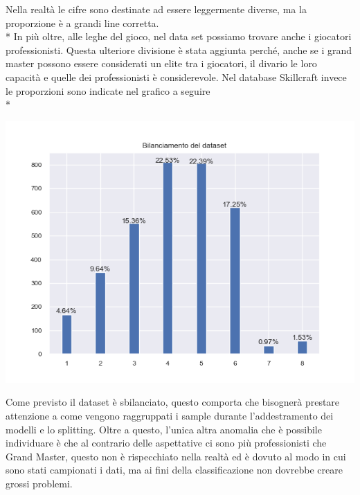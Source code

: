 Nella realtà le cifre sono destinate ad essere leggermente diverse, ma la proporzione è a grandi line corretta. \\*
In più oltre, alle leghe del gioco, nel data set possiamo trovare anche i giocatori professionisti. Questa ulteriore divisione è stata aggiunta perché, anche se i grand master possono essere considerati un elite tra i giocatori, il divario le loro capacità e quelle dei professionisti è considerevole. 
Nel database Skillcraft invece le proporzioni sono indicate nel grafico a seguire\\*
\begin{center}
	\includegraphics[scale=0.8]{../figures/sbilanciamento.PNG}
\end{center}
\par
Come previsto il dataset è sbilanciato, questo comporta che bisognerà prestare attenzione a come vengono raggruppati i sample durante l’addestramento dei modelli e lo splitting. Oltre a questo, l’unica altra anomalia che è possibile individuare è che al contrario delle aspettative ci sono più professionisti che Grand Master, questo non è rispecchiato nella realtà ed è dovuto al modo in cui sono stati campionati i dati, ma ai fini della classificazione non dovrebbe creare grossi problemi.

